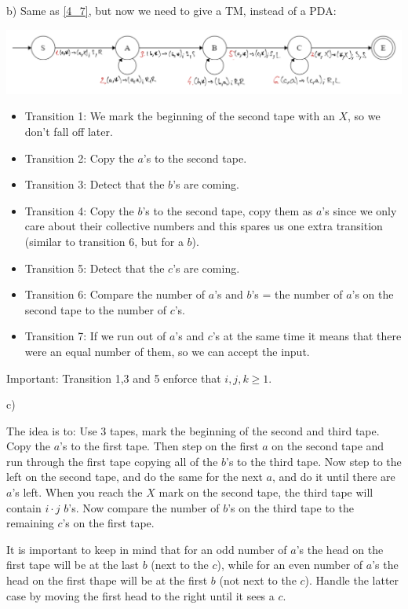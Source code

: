 b) Same as \ref{4_7}, but now we need to give a TM, instead of a PDA:

\includegraphics[width=\linewidth]{05/6_7_b_canvas.png}

\begin{itemize}
    \item Transition 1: We mark the beginning of the second tape with an $X$, so we don't fall off later.
    \item Transition 2: Copy the $a$'s to the second tape.
    \item Transition 3: Detect that the $b$'s are coming.
    \item Transition 4: Copy the $b$'s to the second tape, copy them as $a$'s since we only care about their collective numbers and this spares us one extra transition (similar to transition 6, but for a $b$).
    \item Transition 5: Detect that the $c$'s are coming.
    \item Transition 6: Compare the number of $a$'s and $b$'s = the number of $a$'s on the second tape to the number of $c$'s.
    \item Transition 7: If we run out of $a$'s and $c$'s at the same time it means that there were an equal number of them, so we can accept the input.
\end{itemize}

Important: Transition 1,3 and 5 enforce that $i,j,k \geq{} 1$.

c) 

The idea is to: Use 3 tapes, mark the beginning of the second and third tape. Copy the $a$'s to the first tape. Then step on the first $a$ on the second tape and run through the first tape copying all of the $b$'s to the third tape. Now step to the left on the second tape, and do the same for the next $a$, and do it until there are $a$'s left. When you reach the $X$ mark on the second tape, the third tape will contain $i \cdot j$ $b$'s. Now compare the number of $b$'s on the third tape to the remaining $c$'s on the first tape.

It is important to keep in mind that for an odd number of $a$'s the head on the first tape will be at the last $b$ (next to the $c$), while for an even number of $a$'s the head on the first thape will be at the first $b$ (not next to the $c$). Handle the latter case by moving the first head to the right until it sees a $c$.